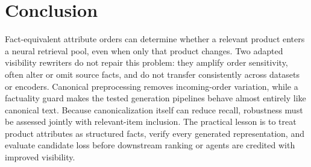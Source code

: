 \section{Conclusion}
Fact-equivalent attribute orders can determine whether a relevant product enters a neural retrieval pool, even when only that product changes. Two adapted visibility rewriters do not repair this problem: they amplify order sensitivity, often alter or omit source facts, and do not transfer consistently across datasets or encoders. Canonical preprocessing removes incoming-order variation, while a factuality guard makes the tested generation pipelines behave almost entirely like canonical text. Because canonicalization itself can reduce recall, robustness must be assessed jointly with relevant-item inclusion. The practical lesson is to treat product attributes as structured facts, verify every generated representation, and evaluate candidate loss before downstream ranking or agents are credited with improved visibility.
